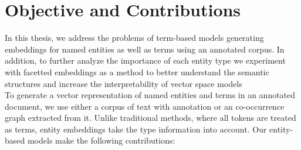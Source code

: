 \section{Objective and Contributions}
In this thesis, we address the problems of term-based models  generating embeddings for named entities as well as terms using an annotated corpus. In addition, to further analyze the importance of each entity type we experiment with facetted embeddings as a method to better understand the semantic structures and increase the interpretability of vector space models\\
To generate a vector representation of named entities and terms in an annotated document, we use either a corpus of text with annotation or an co-occurrence graph extracted from it. Unlike traditional methods, where all tokens are treated as terms, entity embeddings take the type information into account. Our entity-based models make the following contributions:
